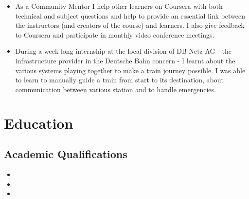 \documentclass[11pt,a4paper,sans]{moderncv}        %
\begin{document}
\begin{itemize}
\item{
{\vspace{3pt}
As a Community Mentor I help other learners on Coursera with both technical and subject questions and help to provide an essential link between the instructors (and creators of the course) and learners. I also give      feedback to Coursera and participate in monthly video conference meetings.}}

\item{
{\vspace{3pt}
During a week-long internship at the local division of DB Netz AG - the infrastructure provider in the Deutsche Bahn concern - I learnt about the various systems playing together to make a train journey possible. I was able to
learn to manually guide a train from start to its destination, about communication between various station and to handle emergencies.}}


\end{itemize}

\section{Education}

\vspace{5pt}

\subsection{Academic Qualifications}

\vspace{5pt}

\begin{itemize}

\item{}

\item{}  %

\item{}

\end{itemize}
\end{document}
